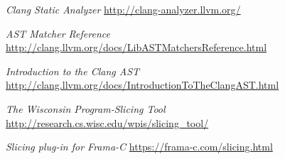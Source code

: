 \documentclass[oneside,12pt,a4paper]{book}
\begin{document}
\begin{thebibliography}{Textttext}
  \emph{Clang Static Analyzer}
  \url{http://clang-analyzer.llvm.org/}

  \emph{AST Matcher Reference}
  \url{http://clang.llvm.org/docs/LibASTMatchersReference.html}
  
  \emph{Introduction to the Clang AST}
  \url{http://clang.llvm.org/docs/IntroductionToTheClangAST.html}
  
  \emph{The Wisconsin Program-Slicing Tool}
  \url{http://research.cs.wisc.edu/wpis/slicing_tool/}

  \emph{Slicing plug-in for Frama-C}
  \url{https://frama-c.com/slicing.html}

\end{thebibliography}
\end{document}
